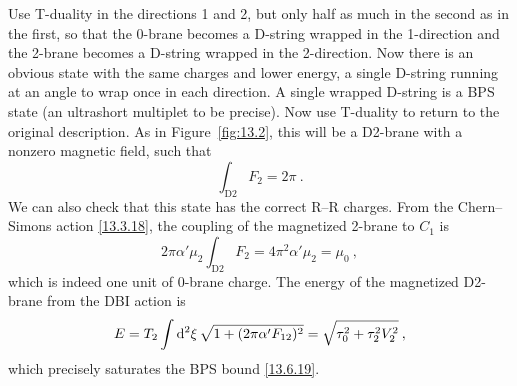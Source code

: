 Use T-duality in the directions 1 and 2, but only half as much in the second as in the first, so that the 0-brane becomes a D-string wrapped in the 1-direction and the 2-brane becomes a D-string wrapped in the 2-direction. Now there is an obvious state with the same charges and lower energy, a single D-string running at an angle to wrap once in each direction. A single wrapped D-string is a BPS state (an ultrashort multiplet to be precise). Now use T-duality to return to the original description. As in Figure~\ref{fig:13.2}, this will be a D2-brane with a nonzero magnetic field, such that
\begin{equation}
	\int_{\mathrm{D}2} F_{\textit{2}} = 2\pi \:. \label{13.6.22}
\end{equation}
We can also check that this state has the correct R--R charges. From the Chern--Simons action \eqref{13.3.18}, the coupling of the magnetized 2-brane to $C_{\textit{1}}$ is
\begin{equation}
	2\pi\alpha'\mu_2\int_{\mathrm{D}2} F_{\textit{2}} = 4\pi^2\alpha'\mu_2 = \mu_0 \:, \label{13.6.23}
\end{equation}
which is indeed one unit of 0-brane charge. The energy of the magnetized D2-brane from the DBI action is
\begin{equation}
	E = T_2\int \mathrm{d}^2\xi\,\sqrt{1 + (2\pi\alpha' F_{12})^2} = \sqrt{\tau_0^2 + \tau_2^2 V_2^2} \:,
\end{equation}
which precisely saturates the BPS bound \eqref{13.6.19}.
